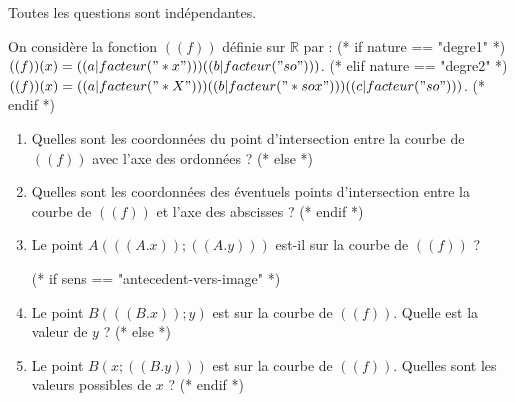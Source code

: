 \exercice
\begin{em}
  Toutes les questions sont indépendantes.
\end{em}

On considère la fonction $((f))$ définie sur $\mathbb{R}$ par :
(* if nature ==  "degre1" *)
$(( f ))(x) = (( a|facteur("*x") ))(( b|facteur("so") ))$.
(* elif nature ==  "degre2" *)
$(( f ))(x) = (( a|facteur("*X") ))(( b|facteur("*sox") ))(( c|facteur("so") ))$.
(* endif *)

\begin{enumerate}
  (* if sens ==  "antecedent-vers-image" *)
  \item Quelles sont les coordonnées du point d'intersection entre la courbe de $(( f ))$ avec l'axe des ordonnées ?
  (* else *)
  \item Quelles sont les coordonnées des éventuels points d'intersection entre la courbe de $(( f ))$ et l'axe des abscisses ?
  (* endif *)

  \item Le point $A( (( A.x )); (( A.y )) )$ est-il sur la courbe de $(( f ))$ ?

  (* if sens ==  "antecedent-vers-image" *)
  \item Le point $B( (( B.x ));y)$ est sur la courbe de $(( f ))$. Quelle est la valeur de $y$ ?
  (* else *)
  \item Le point $B(x; (( B.y )))$ est sur la courbe de $(( f ))$. Quelles sont les valeurs possibles de $x$ ?
  (* endif *)
\end{enumerate}
